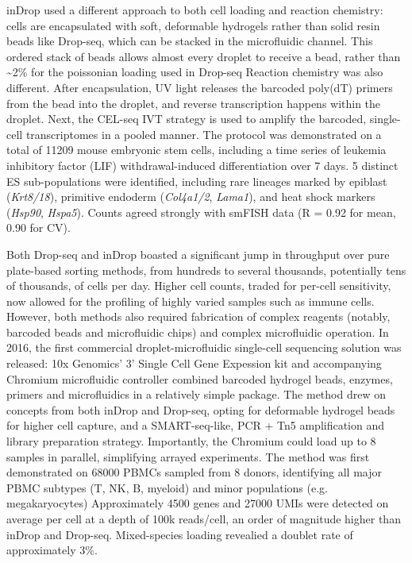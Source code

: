 inDrop used a different approach to both cell loading and reaction chemistry: cells are encapsulated with soft, deformable hydrogels rather than solid resin beads like Drop-seq, which can be stacked in the microfluidic channel. This ordered stack of beads allows almost every droplet to receive a bead, rather than \textasciitilde{2}\% for the poissonian loading used in Drop-seq Reaction chemistry was also different. After encapsulation, UV light releases the barcoded poly(dT) primers from the bead into the droplet, and reverse transcription happens within the droplet. Next, the CEL-seq IVT strategy is used to amplify the barcoded, single-cell transcriptomes in a pooled manner. The protocol was demonstrated on a total of \num{11209} mouse embryonic stem cells, including a time series of leukemia inhibitory factor (LIF) withdrawal-induced differentiation over 7 days. 5 distinct ES sub-populations were identified, including rare lineages marked by epiblast (\textit{Krt8/18}), primitive endoderm (\textit{Col4a1/2}, \textit{Lama1}), and heat shock markers (\textit{Hsp90}, \textit{Hspa5}). Counts agreed strongly with smFISH data (R = 0.92 for mean, 0.90 for CV).

Both Drop-seq and inDrop boasted a significant jump in throughput over pure plate-based sorting methods, from hundreds to several thousands, potentially tens of thousands, of cells per day. Higher cell counts, traded for per-cell sensitivity, now allowed for the profiling of highly varied samples such as immune cells. However, both methods also required fabrication of complex reagents (notably, barcoded beads and microfluidic chips) and complex microfluidic operation. In 2016, the first commercial droplet-microfluidic single-cell sequencing solution was released: 10x Genomics' 3' Single Cell Gene Expession kit and accompanying Chromium microfluidic controller combined barcoded hydrogel beads, enzymes, primers and microfluidics in a relatively simple package. The method drew on concepts from both inDrop and Drop-seq, opting for deformable hydrogel beads for higher cell capture, and a SMART-seq-like, PCR + Tn5 amplification and library preparation strategy. Importantly, the Chromium could load up to 8 samples in parallel, simplifying arrayed experiments. The method was first demonstrated on \num{68000} PBMCs sampled from 8 donors, identifying all major PBMC subtypes (T, NK, B, myeloid) and minor populations (e.g. megakaryocytes) Approximately \num{4500} genes and \num{27000} UMIs were detected on average per cell at a depth of 100k reads/cell, an order of magnitude higher than inDrop and Drop-seq. Mixed-species loading revealied a doublet rate of approximately 3\%.

